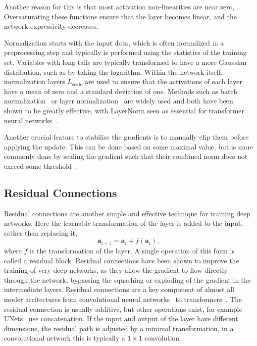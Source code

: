 Another reason for this is that most activation non-linearities are near zero, .
Oversaturating these functions ensure that the layer becomes linear, and the network expressivity decreases.

Normalization starts with the input data, which is often normalized in a preprocessing step and typically is performed using the statistics of the training set.
Variables with long tails are typically transformed to have a more Gaussian distribution, such as by taking the logarithm.
Within the network itself, normalization layers $L_{\text{scale}}$ are used to ensure that the activations of each layer have a mean of zero and a standard deviation of one.
Methods such as batch normalization~\cite{BatchNorm} or layer normalization~\cite{LayerNorm} are widely used and both have been shown to be greatly effective, with LayerNorm seen as essential for transformer neural networks~\cite{AttentionIsAllYouNeed}.

Another crucial feature to stabilise the gradients is to manually clip them before applying the update.
This can be done based on some maximal value, but is more commonly done by scaling the gradient such that their combined norm does not exceed some threshold~\cite{WhyGradientClipping}.

\subsection{Residual Connections}

Residual connections are another simple and effective technique for training deep networks.
Here the learnable transformation of the layer is added to the input, rather than replacing it,
\begin{equation}
    \mathbf{a}_{i+1} = \mathbf{a}_i + f(\mathbf{a}_i),
\end{equation}
where $f$ is the transformation of the layer.
A single operation of this form is called a residual block.
Residual connections have been shown to improve the training of very deep networks, as they allow the gradient to flow directly through the network, bypassing the squashing or exploding of the gradient in the intermediate layers.
Residual connections are a key component of almost all moder arcitectures from convolutional neural networks~\cite{ResNet} to transformers~\cite{Attention}.
The residual connection is usually additive, but other operations exist, for example UNets~\cite{UNet} use concatenation.
If the input and output of the layer have different dimensions, the residual path is adjusted by a minimal transformation, in a convolutional network this is typically a $1 \times 1$ convolution.

